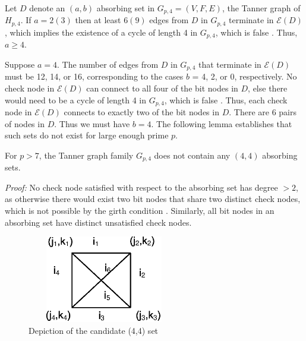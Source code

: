 Let $D$ denote an $(a,b)$ absorbing set in $G_{p,4}=(V,F,E)$, the
Tanner graph of $H_{p,4}$. If $a=2 (3)$ then at least $6 (9)$
edges from $D$ in $G_{p,4}$ terminate in $\mathcal{E}(D)$, which
implies the existence of a cycle of length 4 in $G_{p,4}$, which
is false \cite{fan}. Thus, $a \geq 4$.

Suppose $a=4$. The number of edges from $D$ in $G_{p,4}$ that
terminate in $\mathcal{E}(D)$ must be 12, 14, or 16, corresponding
to the cases $b$ = 4, 2, or 0, respectively. No check node in
$\mathcal{E}(D)$ can connect to all four of the bit nodes in $D$,
else there would need to be a cycle of length 4 in $G_{p,4}$,
which is false \cite{fan}. Thus, each check node in
$\mathcal{E}(D)$ connects to exactly two of the bit nodes in $D$.
There are $6$ pairs of nodes in $D$. Thus we must have $b=4$. The
following lemma establishes that such sets do not exist for large
enough prime $p$.


\begin{lemma}\label{Lem2} For $p>7$, the Tanner graph family $G_{p,4}$
does not contain any $(4,4)$ absorbing sets.
\end{lemma}
\noindent \textit{Proof:} No check node satisfied with respect to
the absorbing set has degree $> 2$, as otherwise there would exist
two bit nodes that share two distinct check nodes, which is not
possible by the girth condition \cite{fan}. Similarly, all bit
nodes in an absorbing set have distinct unsatisfied check nodes.

\begin{figure}
\center\includegraphics[width=2.65in,height=1.5in]{Drawing10_1.eps}
\caption{Depiction of the candidate (4,4) set} \label{fig44}
\end{figure}


